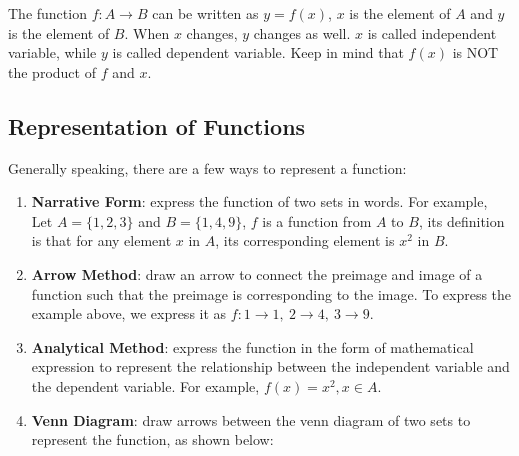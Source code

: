 \documentclass[12pt]{report}
\begin{document}
The function $f: A \to B$ can be written as $y = f(x)$, $x$ is the element of
$A$ and $y$ is the element of $B$. When $x$ changes, $y$ changes as well. $x$
is called independent variable, while $y$ is called dependent variable. Keep in
mind that $f(x)$ is NOT the product of $f$ and $x$.

\newpage

\subsection*{Representation of Functions}

Generally speaking, there are a few ways to represent a function:
\begin{enumerate}
  \item \textbf{Narrative Form}: express the function of two sets in words. For example, Let $A = \big\{1, 2, 3\big\}$ and $B = \big\{1, 4, 9\big\}$, $f$ is a function from $A$ to $B$, its definition is that for any element $x$ in $A$, its corresponding element is $x^2$ in $B$.
  \item \textbf{Arrow Method}: draw an arrow to connect the preimage and image of a function such that the preimage is corresponding to the image. To express the example above, we express it as $f: 1 \to 1,\ 2 \to 4,\ 3 \to 9$.
  \item \textbf{Analytical Method}: express the function in the form of mathematical expression to represent the relationship between the independent variable and the dependent variable. For example, $f(x) = x^2, x \in A$.
  \item \textbf{Venn Diagram}: draw arrows between the venn diagram of two sets to represent the function, as shown below:
        \begin{center}
\end{center}
\end{enumerate}
\end{document}
